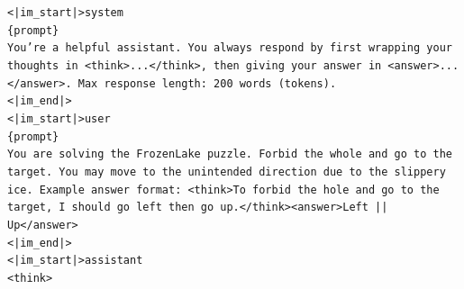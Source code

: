 \begin{tcolorbox}[colback=gray!2, colframe=black, boxrule=0.5pt, arc=2pt, width=0.95\linewidth, title=Model Templates]

\texttt{<|im\_start|>system\\
\{prompt\}\\
You're a helpful assistant. You always respond by first wrapping your thoughts in <think>...</think>, then giving your answer in <answer>...</answer>. Max response length: 200 words (tokens).\\
<|im\_end|>\\
<|im\_start|>user\\
\{prompt\}\\
You are solving the FrozenLake puzzle. Forbid the whole and go to the target. You may move to the unintended direction due to the slippery ice. Example answer format: <think>To forbid the hole and go to the target, I should go left then go up.</think><answer>Left || Up</answer>\\
<|im\_end|>\\
<|im\_start|>assistant\\
<think>}


\end{tcolorbox}






